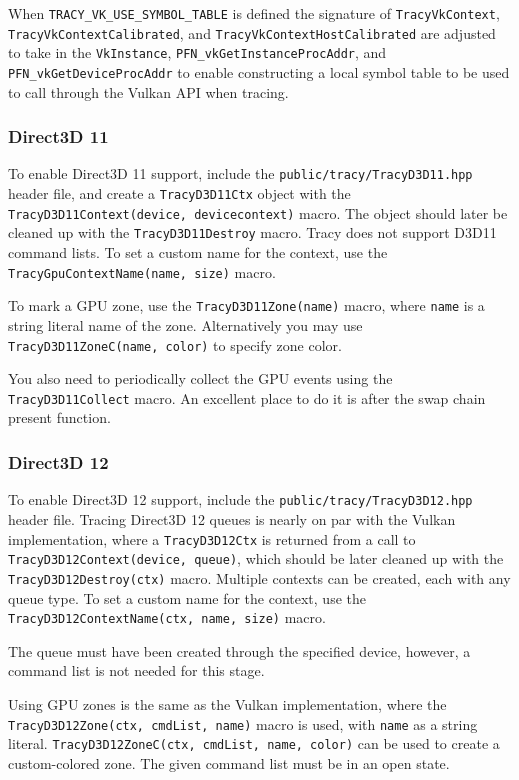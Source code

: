 \documentclass[hidelinks,titlepage,a4paper]{article}
\begin{document}
When \texttt{TRACY\_VK\_USE\_SYMBOL\_TABLE} is defined the signature of \texttt{TracyVkContext}, \texttt{TracyVkContextCalibrated}, and \texttt{TracyVkContextHostCalibrated} are adjusted to take in the \texttt{VkInstance}, \texttt{PFN\_vkGetInstanceProcAddr}, and \texttt{PFN\_vkGetDeviceProcAddr} to enable constructing a local symbol table to be used to call through the Vulkan API when tracing.

\subsubsection{Direct3D 11}

To enable Direct3D 11 support, include the \texttt{public/tracy/TracyD3D11.hpp} header file, and create a \texttt{TracyD3D11Ctx} object with the \texttt{TracyD3D11Context(device, devicecontext)} macro. The object should later be cleaned up with the \texttt{TracyD3D11Destroy} macro. Tracy does not support D3D11 command lists. To set a custom name for the context, use the \texttt{TracyGpuContextName(name, size)} macro.

To mark a GPU zone, use the \texttt{TracyD3D11Zone(name)} macro, where \texttt{name} is a string literal name of the zone. Alternatively you may use \texttt{TracyD3D11ZoneC(name, color)} to specify zone color.

You also need to periodically collect the GPU events using the \texttt{TracyD3D11Collect} macro. An excellent place to do it is after the swap chain present function.

\subsubsection{Direct3D 12}

To enable Direct3D 12 support, include the \texttt{public/tracy/TracyD3D12.hpp} header file. Tracing Direct3D 12 queues is nearly on par with the Vulkan implementation, where a \texttt{TracyD3D12Ctx} is returned from a call to \texttt{TracyD3D12Context(device, queue)}, which should be later cleaned up with the \texttt{TracyD3D12Destroy(ctx)} macro. Multiple contexts can be created, each with any queue type. To set a custom name for the context, use the \texttt{TracyD3D12ContextName(ctx, name, size)} macro.

The queue must have been created through the specified device, however, a command list is not needed for this stage.

Using GPU zones is the same as the Vulkan implementation, where the \texttt{TracyD3D12Zone(ctx, cmdList, name)} macro is used, with \texttt{name} as a string literal. \texttt{TracyD3D12ZoneC(ctx, cmdList, name, color)} can be used to create a custom-colored zone. The given command list must be in an open state.
\end{document}
